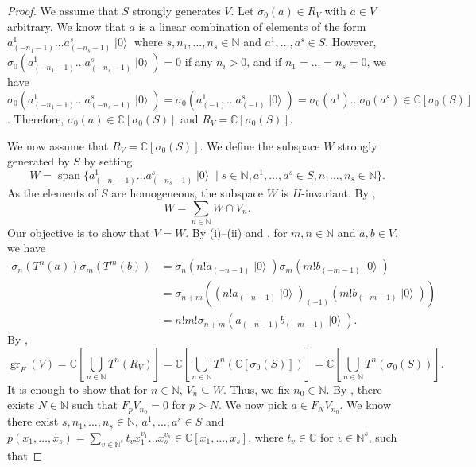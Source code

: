 \documentclass[a4paper, 12pt, reqno]{amsart}
\theoremstyle{remark}
\numberwithin{equation}{subsection}
\DeclareMathOperator{\gr}{gr}
\DeclareMathOperator{\vspan}{span}
\DeclareMathOperator{\vac}{|0\rangle}
\begin{document}
\begin{proof}
  We assume that $S$ strongly generates $V$.
  Let $\sigma_0(a) \in R_V$ with $a \in V$ arbitrary.
  We know that $a$ is a linear combination of elements of the form $a^1_{(-n_1 - 1)}\dots a^s_{(-n_s - 1)}\vac$ where $s, n_1, \dots, n_s \in \mathbb{N}$ and $a^1, \dots, a^s \in S$.
  However, $\sigma_0(a^1_{(-n_1 - 1)}\dots a^s_{(-n_s - 1)}\vac) = 0$ if any $n_i > 0$, and if $n_1 = \dots = n_s = 0$, we have $\sigma_0(a^1_{(-n_1 - 1)}\dots a^s_{(-n_s - 1)}\vac) = \sigma_0(a^1_{(-1)}\dots a^s_{(-1)}\vac) = \sigma_0(a^1)\dots\sigma_0(a^s) \in \mathbb{C}[\sigma_0(S)]$.
  Therefore, $\sigma_0(a) \in \mathbb{C}[\sigma_0(S)]$ and $R_V = \mathbb{C}[\sigma_0(S)]$.
  
  We now assume that $R_V = \mathbb{C}[\sigma_0(S)]$.
  We define the subspace $W$ strongly generated by $S$ by setting
  \begin{equation*}
    W = \vspan\{a^1_{(-n_1 - 1)}\dots a^s_{(-n_s - 1)}\vac \mid s \in \mathbb{N}, a^1, \dots, a^s \in S, n_1 \dots, n_s \in \mathbb{N}\}.
  \end{equation*}
  As the elements of $S$ are homogeneous, the subspace $W$ is $H$-invariant.
  By ,
  \begin{equation}
    \label{eq:37}
    W = \sum_{n \in \mathbb{N}}W \cap V_n.
  \end{equation}
  Our objective is to show that $V = W$.
  By (i)--(ii) and , for $m, n \in \mathbb{N}$ and $a, b \in V$, we have
  \begin{align*}
    \sigma_n(T^n(a))\sigma_m(T^m(b)) &= \sigma_n(n!a_{(-n - 1)}\vac)\sigma_m(m!b_{(-m - 1)}\vac) \\
    &= \sigma_{n + m}((n!a_{(-n - 1)}\vac)_{(-1)}(m!b_{(-m - 1)}\vac)) \\
    &= n!m!\sigma_{n + m}(a_{(-n - 1)}b_{(-m - 1)}\vac).
  \end{align*}
  By ,
  \begin{equation*}
    \gr_F(V) = \mathbb{C}\left[\bigcup_{n \in \mathbb{N}}T^n(R_V)\right] = \mathbb{C}\left[\bigcup_{n \in \mathbb{N}}T^n(\mathbb{C}[\sigma_0(S)])\right] = \mathbb{C}\left[\bigcup_{n \in \mathbb{N}}T^n(\sigma_0(S))\right].
  \end{equation*}
  It is enough to show that for $n \in \mathbb{N}$, $V_n \subseteq W$.
  Thus, we fix $n_0 \in \mathbb{N}$.
  By , there exists $N \in \mathbb{N}$ such that $F_pV_{n_0} = 0$ for $p > N$.
  We now pick $a \in F_NV_{n_0}$.
  We know there exist $s, n_1, \dots, n_s \in \mathbb{N}$, $a^1, \dots, a^s \in S$ and $p(x_1, \dots, x_s) = \sum_{v \in \mathbb{N}^s}t_vx_1^{v_1}\dots x_s^{v_s} \in \mathbb{C}[x_1, \dots, x_s]$, where $t_v \in \mathbb{C}$ for $v \in \mathbb{N}^s$, such that 

\end{proof}
\end{document}

